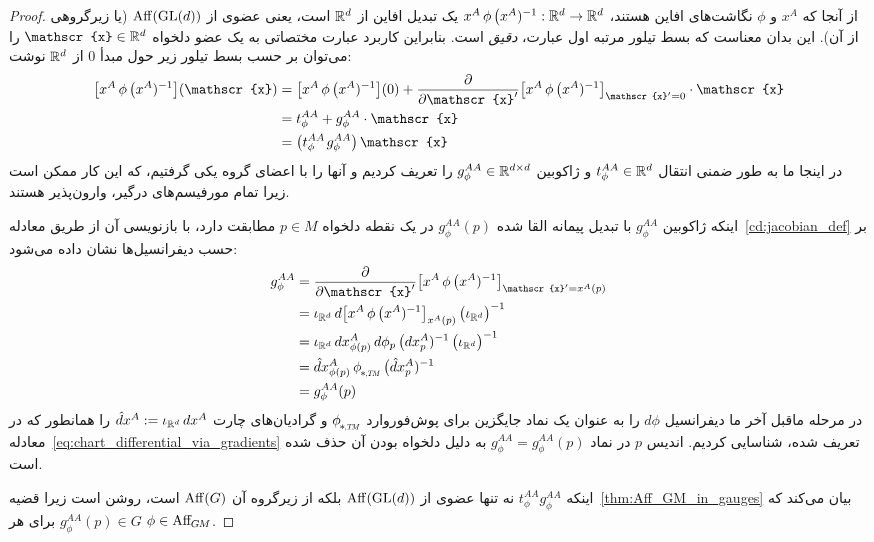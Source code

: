 \begin{proof}
	از آنجا که $x^A$ و $\phi$ نگاشت‌های افاین هستند، $x^A \,\phi\, \big(x^A)^{-1}: \mathbb{R}^d \to \mathbb{R}^d$ یک تبدیل افاین از $\mathbb{R}^d$ است، یعنی عضوی از $\operatorname{Aff}(\operatorname{GL}(d))$ (یا زیرگروهی از آن).
	این بدان معناست که بسط تیلور مرتبه اول عبارت، \emph{دقیق} است.
	بنابراین کاربرد عبارت مختصاتی به یک عضو دلخواه $\mathscr{x} \in \R^d$ را می‌توان بر حسب بسط تیلور زیر حول مبدأ $0$ از $\mathbb{R}^d$ نوشت:
	\begin{align}
		\big[ x^A \,\phi\, \big(x^A)^{-1} \big] (\mathscr{x})
		&= \big[ x^A \,\phi\, \big(x^A)^{-1} \big] (0) + 
		\frac{\partial}{\partial \mathscr{x}'} \big[ x^A \,\phi\, \big(x^A)^{-1} \big]_{\mathscr{x}' = 0} \cdot \mathscr{x} \notag \\
		&= t_\phi^{AA} + g_\phi^{AA} \cdot \mathscr{x} \notag \\
		&= \big( t_\phi^{AA} \mkern2mu g_\phi^{AA} \big) \, \mathscr{x}
	\end{align}
	در اینجا ما به طور ضمنی انتقال $t_\phi^{AA} \in \mathbb{R}^d$ و ژاکوبین $g_\phi^{AA} \in \mathbb{R}^{d\times d}$ را تعریف کردیم و آنها را با اعضای گروه یکی گرفتیم، که این کار ممکن است زیرا تمام مورفیسم‌های درگیر، وارون‌پذیر هستند.
	
	اینکه ژاکوبین $g_\phi^{AA}$ با تبدیل پیمانه القا شده $g_\phi^{AA}(p)$ در یک نقطه دلخواه $p\in M$ مطابقت دارد، با بازنویسی آن از طریق معادله~\eqref{cd:jacobian_def} بر حسب دیفرانسیل‌ها نشان داده می‌شود:
	\begin{align}
		g_\phi^{AA}
		&= \frac{\partial}{\partial \mathscr{x}'} \big[ x^A \,\phi\, \big(x^A)^{-1} \big]_{\mathscr{x}' = x^A(p)} \notag \\
		&= \iota_{\R^d}\, d\big[ x^A \,\phi\, \big(x^A)^{-1} \big]_{x^A(p)} \, \big(\iota_{\R^d} \big)^{-1} \notag \\
		&= \iota_{\R^d}\, dx^A_{\phi(p)} \,d\phi_p\, \big(dx^A_p)^{-1}\, \big(\iota_{\R^d} \big)^{-1} \notag \\
		&= \hat{d}x^A_{\phi(p)} \,\dphiTM\, \big(\hat{d}x^A_p)^{-1} \notag \\
		&= g_\phi^{AA}(p)
	\end{align}
	در مرحله ماقبل آخر ما دیفرانسیل $d\phi$ را به عنوان یک نماد جایگزین برای پوش‌فوروارد $\dphiTM$ و گرادیان‌های چارت $\hat{d}x^A := \iota_{\mathbb{R}^d}\, dx^A$ را همانطور که در معادله~\eqref{eq:chart_differential_via_gradients} تعریف شده، شناسایی کردیم.
	اندیس $p$ در نماد $g_\phi^{AA} = g_\phi^{AA}(p)$ به دلیل دلخواه بودن آن حذف شده است.
	
	اینکه $t_\phi^{AA} g_\phi^{AA}$ نه تنها عضوی از $\operatorname{Aff}(\operatorname{GL}(d))$ بلکه از زیرگروه آن $\operatorname{Aff}(G)$ است، روشن است زیرا قضیه~\ref{thm:Aff_GM_in_gauges} بیان می‌کند که $g_\phi^{AA}(p) \in G$ برای هر $\phi \in \operatorname{Aff}_{\mkern-2muG\mkern-1.4muM}$.
	

\end{proof}
